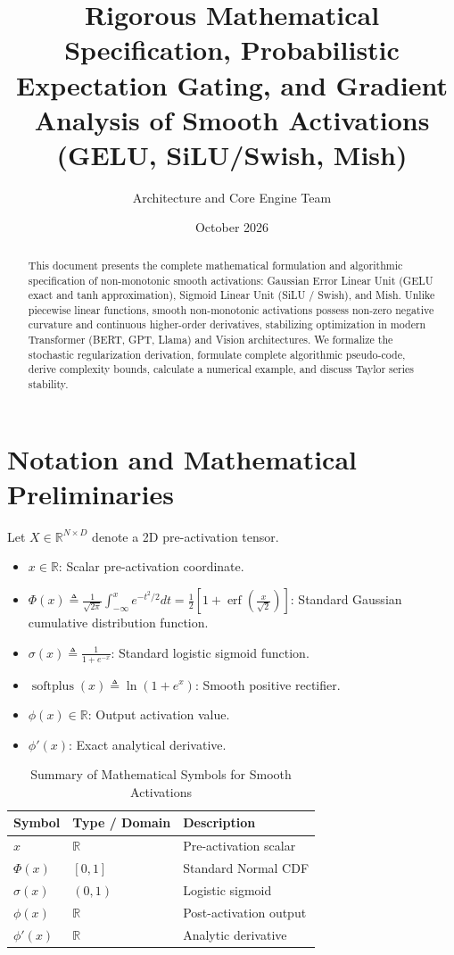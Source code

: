 \documentclass[11pt,a4paper]{article}
\title{\textbf{Rigorous Mathematical Specification, Probabilistic Expectation Gating, and Gradient Analysis of Smooth Activations (GELU, SiLU/Swish, Mish)}}
\author{Architecture and Core Engine Team}
\date{October 2026}
\theoremstyle{definition}
\begin{document}
\maketitle

\begin{abstract}
This document presents the complete mathematical formulation and algorithmic specification of non-monotonic smooth activations: Gaussian Error Linear Unit (GELU exact and tanh approximation), Sigmoid Linear Unit (SiLU / Swish), and Mish. Unlike piecewise linear functions, smooth non-monotonic activations possess non-zero negative curvature and continuous higher-order derivatives, stabilizing optimization in modern Transformer (BERT, GPT, Llama) and Vision architectures. We formalize the stochastic regularization derivation, formulate complete algorithmic pseudo-code, derive complexity bounds, calculate a numerical example, and discuss Taylor series stability.
\end{abstract}

\section{Notation and Mathematical Preliminaries}

Let $X \in \mathbb{R}^{N \times D}$ denote a 2D pre-activation tensor.

\begin{itemize}
    \item $x \in \mathbb{R}$: Scalar pre-activation coordinate.
    \item $\Phi(x) \triangleq \frac{1}{\sqrt{2\pi}} \int_{-\infty}^x e^{-t^2/2} dt = \frac{1}{2}\left[1 + \operatorname{erf}\left(\frac{x}{\sqrt{2}}\right)\right]$: Standard Gaussian cumulative distribution function.
    \item $\sigma(x) \triangleq \frac{1}{1 + e^{-x}}$: Standard logistic sigmoid function.
    \item $\operatorname{softplus}(x) \triangleq \ln(1 + e^x)$: Smooth positive rectifier.
    \item $\phi(x) \in \mathbb{R}$: Output activation value.
    \item $\phi'(x)$: Exact analytical derivative.
\end{itemize}

\begin{table}[h]
\centering
\caption{Summary of Mathematical Symbols for Smooth Activations}
\begin{tabular}{lll}
\toprule
\textbf{Symbol} & \textbf{Type / Domain} & \textbf{Description} \\
\midrule
$x$ & $\mathbb{R}$ & Pre-activation scalar \\
$\Phi(x)$ & $[0, 1]$ & Standard Normal CDF \\
$\sigma(x)$ & $(0, 1)$ & Logistic sigmoid \\
$\phi(x)$ & $\mathbb{R}$ & Post-activation output \\
$\phi'(x)$ & $\mathbb{R}$ & Analytic derivative \\
\bottomrule
\end{tabular}
\end{table}
\end{document}
